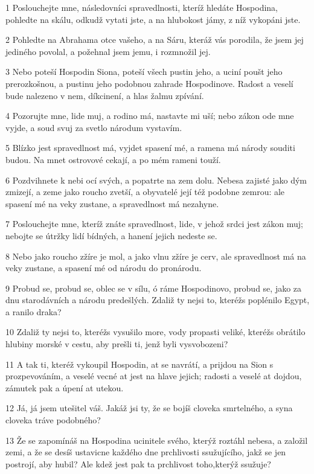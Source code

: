\par 1 Poslouchejte mne, následovníci spravedlnosti, kteríž hledáte Hospodina, pohledte na skálu, odkudž vytati jste, a na hlubokost jámy, z níž vykopáni jste.
\par 2 Pohledte na Abrahama otce vašeho, a na Sáru, kteráž vás porodila, že jsem jej jediného povolal, a požehnal jsem jemu, i rozmnožil jej.
\par 3 Nebo poteší Hospodin Siona, poteší všech pustin jeho, a uciní poušt jeho prerozkošnou, a pustinu jeho podobnou zahrade Hospodinove. Radost a veselí bude nalezeno v nem, díkcinení, a hlas žalmu zpívání.
\par 4 Pozorujte mne, lide muj, a rodino má, nastavte mi uší; nebo zákon ode mne vyjde, a soud svuj za svetlo národum vystavím.
\par 5 Blízko jest spravedlnost má, vyjdet spasení mé, a ramena má národy souditi budou. Na mnet ostrovové cekají, a po mém rameni touží.
\par 6 Pozdvihnete k nebi ocí svých, a popatrte na zem dolu. Nebesa zajisté jako dým zmizejí, a zeme jako roucho zvetší, a obyvatelé její též podobne zemrou: ale spasení mé na veky zustane, a spravedlnost má nezahyne.
\par 7 Poslouchejte mne, kteríž znáte spravedlnost, lide, v jehož srdci jest zákon muj; nebojte se útržky lidí bídných, a hanení jejich nedeste se.
\par 8 Nebo jako roucho zžíre je mol, a jako vlnu zžíre je cerv, ale spravedlnost má na veky zustane, a spasení mé od národu do pronárodu.
\par 9 Probud se, probud se, oblec se v sílu, ó ráme Hospodinovo, probud se, jako za dnu starodávních a národu predešlých. Zdaliž ty nejsi to, kteréžs poplénilo Egypt, a ranilo draka?
\par 10 Zdaliž ty nejsi to, kteréžs vysušilo more, vody propasti veliké, kteréžs obrátilo hlubiny morské v cestu, aby prešli ti, jenž byli vysvobozeni?
\par 11 A tak ti, kteréž vykoupil Hospodin, at se navrátí, a prijdou na Sion s prozpevováním, a veselé vecné at jest na hlave jejich; radosti a veselé at dojdou, zámutek pak a úpení at utekou.
\par 12 Já, já jsem utešitel váš. Jakáž jsi ty, že se bojíš cloveka smrtelného, a syna cloveka tráve podobného?
\par 13 Že se zapomínáš na Hospodina ucinitele svého, kterýž roztáhl nebesa, a založil zemi, a že se desíš ustavicne každého dne prchlivosti ssužujícího, jakž se jen postrojí, aby hubil? Ale kdež jest pak ta prchlivost toho,kterýž ssužuje?
